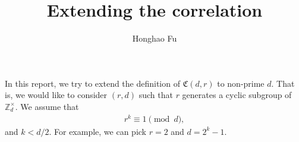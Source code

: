 \documentclass[11pt,letterpaper]{article}
\newcommand{\Z}{\mathbb{Z}}
\newcommand{\Zd}{\Z_d^{\times}}
\newcommand{\1}{\mathbb{1}}
\newcommand{\fC}{\mathfrak{C}}
\theoremstyle{definition}
\begin{document}
\title{Extending the correlation}

\author[1]{Honghao Fu}


\renewcommand\Affilfont{\itshape\small}




\maketitle

In this report, we try to extend the definition of $\fC(d,r)$ to non-prime $d$.
That is, we would like to consider $(r,d)$ such that $r$ generates a cyclic subgroup
of $\Zd$. We assume that 
\begin{align*}
   r^k \equiv 1 \pmod{d},
\end{align*}
and $k < d/2$.
For example, we can pick $r = 2$ and $d = 2^k - 1$.
\end{document}
